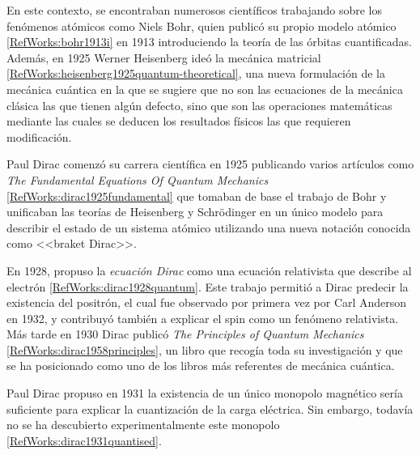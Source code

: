 En este contexto, se encontraban numerosos científicos trabajando sobre los fenómenos atómicos como Niels Bohr, quien publicó su propio modelo atómico \ref{RefWorks:bohr1913i} en 1913 introduciendo la teoría de las órbitas cuantificadas. Además, en 1925 Werner Heisenberg ideó la mecánica matricial \ref{RefWorks:heisenberg1925quantum-theoretical}, una nueva formulación de la mecánica cuántica en la que se sugiere que no son las ecuaciones de la mecánica clásica las que tienen algún defecto, sino que son las operaciones matemáticas mediante las cuales se deducen los resultados físicos las que requieren modificación.

Paul Dirac comenzó su carrera científica en 1925 publicando varios artículos como \textit{The Fundamental Equations Of Quantum Mechanics} \ref{RefWorks:dirac1925fundamental} que tomaban de base el trabajo de Bohr y unificaban las teorías de Heisenberg y Schrödinger en un único modelo para describir el estado de un sistema atómico utilizando una nueva notación conocida como <<braket Dirac>>.

En 1928, propuso la \textit{ecuación Dirac} como una ecuación relativista que describe al electrón \ref{RefWorks:dirac1928quantum}. Este trabajo permitió a Dirac predecir la existencia del positrón, el cual fue observado por primera vez por Carl Anderson en 1932, y contribuyó también a explicar el spin como un fenómeno relativista. Más tarde en 1930 Dirac publicó \textit{The Principles of Quantum Mechanics} \ref{RefWorks:dirac1958principles}, un libro que recogía toda su investigación y que se ha posicionado como uno de los libros más referentes de mecánica cuántica.

Paul Dirac propuso en 1931 la existencia de un único monopolo magnético sería suficiente para explicar la cuantización de la carga eléctrica. Sin embargo, todavía no se ha descubierto experimentalmente este monopolo \ref{RefWorks:dirac1931quantised}.


\printbibliography
